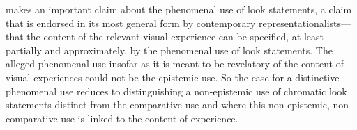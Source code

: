 \documentclass[12pt]{article}
\begin{document}

\citet{Jackson:1977fk} makes an important claim about the phenomenal use of look statements, a claim that is endorsed in its most general form by contemporary representationalists---that the content of the relevant visual experience can be specified, at least partially and approximately, by the phenomenal use of look statements. The alleged phenomenal use insofar as it is meant to be revelatory of the content of visual experiences could not be the epistemic use. So the case for a distinctive phenomenal use reduces to distinguishing a non-epistemic use of chromatic look statements distinct from the comparative use and where this non-epistemic, non-comparative use is linked to the content of experience.
\end{document}
